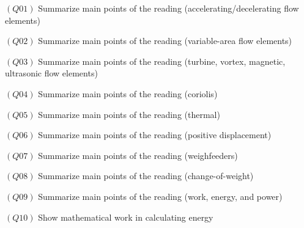 \medskip
\item{$(Q01)$} Summarize main points of the reading (accelerating/decelerating flow elements)
\item{$(Q02)$} Summarize main points of the reading (variable-area flow elements)
\item{$(Q03)$} Summarize main points of the reading (turbine, vortex, magnetic, ultrasonic flow elements)
\item{$(Q04)$} Summarize main points of the reading (coriolis)
\item{$(Q05)$} Summarize main points of the reading (thermal)
\item{$(Q06)$} Summarize main points of the reading (positive displacement)
\item{$(Q07)$} Summarize main points of the reading (weighfeeders)
\item{$(Q08)$} Summarize main points of the reading (change-of-weight)
\item{$(Q09)$} Summarize main points of the reading (work, energy, and power)
\item{$(Q10)$} Show mathematical work in calculating energy
\medskip

